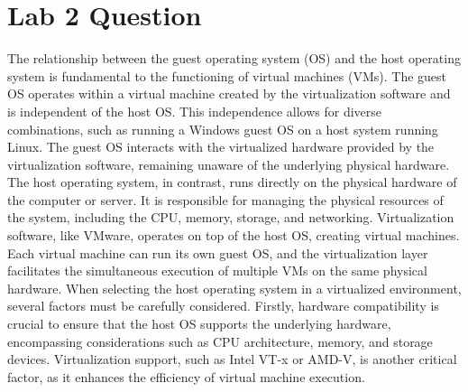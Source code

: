 \documentclass[letterpaper, 10pt]{article}
\begin{document}
\noindent

\vspace{2em}

\section{Lab 2 Question}

The relationship between the guest operating system (OS) and the host operating system is fundamental to the functioning of virtual machines (VMs). The guest OS operates within a virtual machine created by the virtualization software and is independent of the host OS. This independence allows for diverse combinations, such as running a Windows guest OS on a host system running Linux. The guest OS interacts with the virtualized hardware provided by the virtualization software, remaining unaware of the underlying physical hardware. The host operating system, in contrast, runs directly on the physical hardware of the computer or server. It is responsible for managing the physical resources of the system, including the CPU, memory, storage, and networking. Virtualization software, like VMware, operates on top of the host OS, creating virtual machines. Each virtual machine can run its own guest OS, and the virtualization layer facilitates the simultaneous execution of multiple VMs on the same physical hardware. When selecting the host operating system in a virtualized environment, several factors must be carefully considered. Firstly, hardware compatibility is crucial to ensure that the host OS supports the underlying hardware, encompassing considerations such as CPU architecture, memory, and storage devices. Virtualization support, such as Intel VT-x or AMD-V, is another critical factor, as it enhances the efficiency of virtual machine execution.
\end{document}
